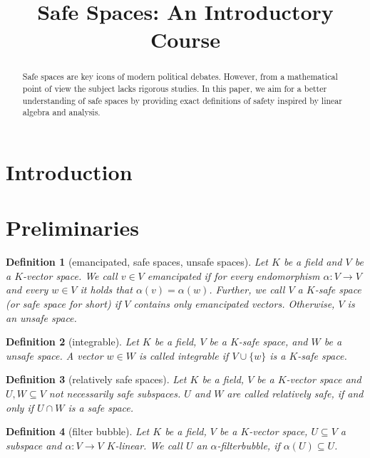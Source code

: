 \documentclass[]{article}
\newtheorem{definition}{Definition}
\begin{document}
\title{Safe Spaces: An Introductory Course}

\maketitle 

\begin{abstract}
Safe spaces are key icons of modern political debates. However, from a mathematical point of view the subject lacks rigorous studies. In this paper, we aim for a better understanding of safe spaces by providing exact definitions of safety inspired by linear algebra and analysis. 
\end{abstract}

\section{Introduction}



\section{Preliminaries}

\begin{definition}[emancipated, safe spaces, unsafe spaces]
	Let $K$ be a field and $V$ be a $K$-vector space. We call $v \in V$ \emph{emancipated} if for every endomorphism $\alpha: V \to V$ and every $w \in V$ it holds that $\alpha(v) = \alpha(w)$. Further, we call $V$ a \emph{$K$-safe space} (or \emph{safe space} for short) if $V$ contains only emancipated vectors. Otherwise, $V$ is an \emph{unsafe space}.
\end{definition}


\begin{definition}[integrable]
	Let $K$ be a field, $V$ be a $K$-safe space, and $W$ be a unsafe space.
	A vector $w \in W$ is called \emph{integrable} if $V \cup \{w\}$ is a $K$-safe space.
\end{definition}

\begin{definition}[relatively safe spaces]
    Let $K$ be a field, $V$ be a $K$-vector space and $U, W \subseteq V $ not
    necessarily safe subspaces. $U$ and $W$ are called \emph{relatively safe}, if
    and only if $U \cap W$ is a safe space.
\end{definition}

\begin{definition}[filter bubble]
    Let $K$ be a field, $V$ be a $K$-vector space, $U \subseteq V$ a subspace
    and $\alpha: V \to V$ $K$-linear. We call $U$ an
    \emph{$\alpha$-filterbubble}, if $\alpha(U) \subseteq U$.
\end{definition}
\end{document}
